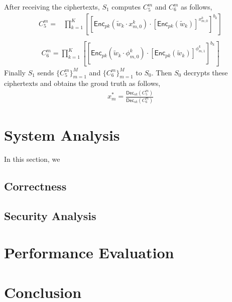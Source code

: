 \documentclass[conference]{IEEEtran}
\begin{document}
After receiving the ciphertexts, $S_1$ computes $C_5^m$ and $C_6^m$ as follows,
\begin{equation}
  \begin{split}
    C_5^m = &\prod_{k=1}^K\left[\left[\mathsf{Enc}_{pk}\left(\tilde{w}_k\cdot x_{m,0}^k\right)\cdot \left[\mathsf{Enc}_{pk}\left(\tilde{w}_k\right)\right]^{x_{m,0}^k}\right]^{b_k} \right] \\
  \end{split}
\end{equation}
\begin{equation}
  \begin{split}
    C_6^m = \prod_{k=1}^K \left[ \left[ \mathsf{Enc}_{pk}(\tilde{w}_k\cdot \phi_{m,0}^k) \cdot \left[\mathsf{Enc}_{pk}(\tilde{w}_k)\right]^{\phi_{m,1}^k}\right]^{b_k} \right]
  \end{split}
\end{equation}
Finally $S_1$ sends $\{C_5^m\}_{m=1}^M$ and $\{C_6^m\}_{m=1}^M$ to $S_0$.
Then $S_0$ decrypts these ciphertexts and obtains the groud truth as follows,
\begin{equation}
  \begin{split}
    x_m^* = \frac{\mathsf{Dec}_{sk}(C_5^m)}{\mathsf{Dec}_{sk}(C_6^m)}
  \end{split}
\end{equation}

\section{System Analysis}\label{sec6}
In this section, we 
\subsection{Correctness}
\subsection{Security Analysis}

\section{Performance Evaluation}\label{sec7}

\section{Conclusion}\label{sec8}




\vspace{12pt}
\end{document}
